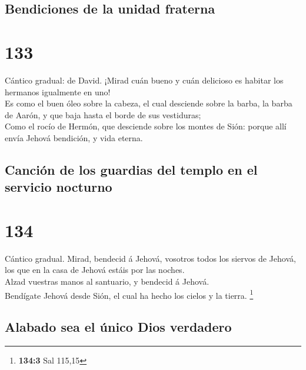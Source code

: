 \hypertarget{bendiciones-de-la-unidad-fraterna}{%
\subsection{Bendiciones de la unidad
fraterna}\label{bendiciones-de-la-unidad-fraterna}}

\hypertarget{section-132}{%
\section{133}\label{section-132}}

 Cántico gradual: de David. ¡Mirad cuán bueno y cuán
delicioso es habitar los hermanos igualmente en uno!\\
 Es como el buen óleo sobre la cabeza, el cual desciende
sobre la barba, la barba de Aarón, y que baja hasta el borde de sus
vestiduras;\\
 Como el rocío de Hermón, que desciende sobre los montes de
Sión: porque allí envía Jehová bendición, y vida eterna.

\hypertarget{canciuxf3n-de-los-guardias-del-templo-en-el-servicio-nocturno}{%
\subsection{Canción de los guardias del templo en el servicio
nocturno}\label{canciuxf3n-de-los-guardias-del-templo-en-el-servicio-nocturno}}

\hypertarget{section-133}{%
\section{134}\label{section-133}}

 Cántico gradual. Mirad, bendecid á Jehová, vosotros todos
los siervos de Jehová, los que en la casa de Jehová estáis por las
noches.\\
 Alzad vuestras manos al santuario, y bendecid á Jehová.\\
 Bendígate Jehová desde Sión, el cual ha hecho los cielos y
la tierra. \footnote{\textbf{134:3} Sal 115,15}

\hypertarget{alabado-sea-el-uxfanico-dios-verdadero}{%
\subsection{Alabado sea el único Dios
verdadero}\label{alabado-sea-el-uxfanico-dios-verdadero}}

